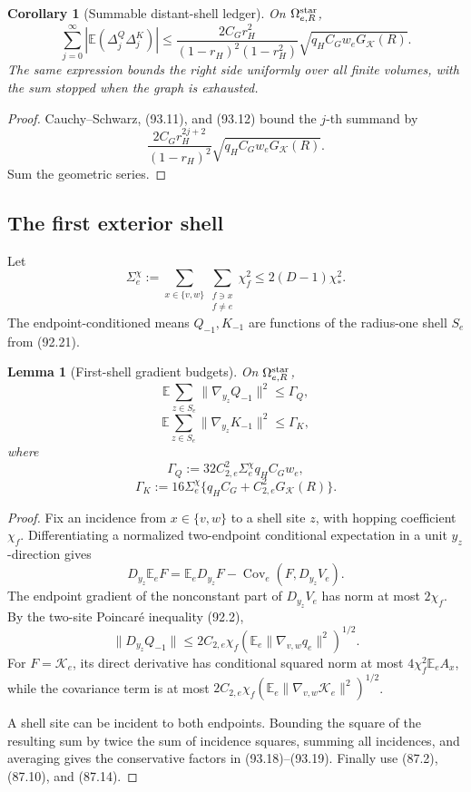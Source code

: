 \documentclass[11pt]{article}
\newtheorem{lemma}[theorem]{Lemma}
\newtheorem{corollary}[theorem]{Corollary}
\theoremstyle{remark}
\begin{document}
\begin{corollary}[Summable distant-shell ledger]
\label{cor:v17v93-distant-shells}
On \(\Omega_{e,R}^{\rm star}\),
\[
\boxed{
 \sum_{j=0}^{\infty}
 \left|\mathbb E(\Delta_j^Q\Delta_j^K)\right|
 \leq
 \frac{2C_Gr_H^2}{(1-r_H)^2(1-r_H^2)}
 \sqrt{q_HC_Gw_eG_{\mathcal K}(R)}.}                \tag{93.13}
\]
The same expression bounds the right side uniformly over all finite
volumes, with the sum stopped when the graph is exhausted.
\end{corollary}

\begin{proof}
Cauchy--Schwarz, (93.11), and (93.12) bound the \(j\)-th summand by
\[
 \frac{2C_Gr_H^{2j+2}}{(1-r_H)^2}
 \sqrt{q_HC_Gw_eG_{\mathcal K}(R)}.                 \tag{93.14}
\]
Sum the geometric series.
\end{proof}

\subsection{The first exterior shell}

Let
\[
 \Sigma_e^\chi
 :=\sum_{x\in\{v,w\}}
   \sum_{\substack{f\ni x\\f\ne e}}\chi_f^2
 \leq2(D-1)\chi_*^2.                               \tag{93.15}
\]
The endpoint-conditioned means \(Q_{-1},K_{-1}\) are functions of the
radius-one shell \(S_e\) from (92.21).

\begin{lemma}[First-shell gradient budgets]
\label{lem:v17v93-first-gradient}
On \(\Omega_{e,R}^{\rm star}\),
\[
 \mathbb E\sum_{z\in S_e}\|\nabla_{y_z}Q_{-1}\|^2
 \leq\Gamma_Q,                                      \tag{93.16}
\]
\[
 \mathbb E\sum_{z\in S_e}\|\nabla_{y_z}K_{-1}\|^2
 \leq\Gamma_K,                                      \tag{93.17}
\]
where
\[
 \Gamma_Q
 :=32C_{2,e}^2\Sigma_e^\chi q_HC_Gw_e,             \tag{93.18}
\]
\[
 \Gamma_K
 :=16\Sigma_e^\chi
       \{q_HC_G+C_{2,e}^2G_{\mathcal K}(R)\}.       \tag{93.19}
\]
\end{lemma}

\begin{proof}
Fix an incidence from \(x\in\{v,w\}\) to a shell site \(z\), with
hopping coefficient \(\chi_f\).  Differentiating a normalized
two-endpoint conditional expectation in a unit \(y_z\)-direction
gives
\[
 D_{y_z}\mathbb E_eF
 =\mathbb E_eD_{y_z}F
  -\operatorname{Cov}_e(F,D_{y_z}V_e).              \tag{93.20}
\]
The endpoint gradient of the nonconstant part of
\(D_{y_z}V_e\) has norm at most \(2\chi_f\).  By the two-site
Poincar\'e inequality (92.2),
\[
 \|D_{y_z}Q_{-1}\|
 \leq2C_{2,e}\chi_f
       (\mathbb E_e\|\nabla_{v,w}q_e\|^2)^{1/2}.    \tag{93.21}
\]
For \(F=\mathcal K_e\), its direct derivative has conditional
squared norm at most \(4\chi_f^2\mathbb E_eA_x\), while the covariance
term is at most
\(2C_{2,e}\chi_f
(\mathbb E_e\|\nabla_{v,w}\mathcal K_e\|^2)^{1/2}\).

A shell site can be incident to both endpoints.  Bounding the square
of the resulting sum by twice the sum of incidence squares, summing
all incidences, and averaging gives the conservative factors in
(93.18)--(93.19).  Finally use (87.2), (87.10), and (87.14).
\end{proof}
\end{document}
